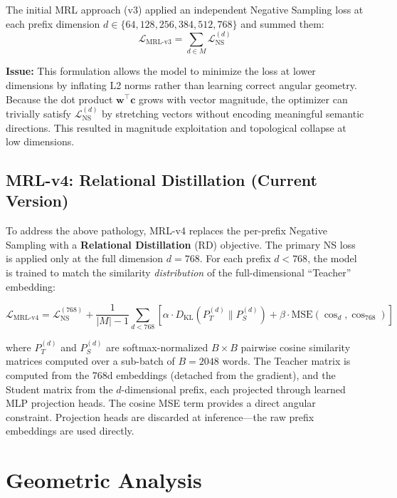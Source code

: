 \documentclass[11pt,a4paper]{article}
\begin{document}
The initial MRL approach (v3) applied an independent Negative Sampling loss at each prefix dimension $d \in \{64, 128, 256, 384, 512, 768\}$ and summed them:
\begin{equation}
\mathcal{L}_{\text{MRL-v3}} = \sum_{d \in M} \mathcal{L}_{\text{NS}}^{(d)}
\end{equation}

\textbf{Issue:} This formulation allows the model to minimize the loss at lower dimensions by inflating L2 norms rather than learning correct angular geometry. Because the dot product $\mathbf{w}^\top \mathbf{c}$ grows with vector magnitude, the optimizer can trivially satisfy $\mathcal{L}_{\text{NS}}^{(d)}$ by stretching vectors without encoding meaningful semantic directions. This resulted in magnitude exploitation and topological collapse at low dimensions.

\subsection{MRL-v4: Relational Distillation (Current Version)}

To address the above pathology, MRL-v4 replaces the per-prefix Negative Sampling with a \textbf{Relational Distillation} (RD) objective. The primary NS loss is applied only at the full dimension $d=768$. For each prefix $d < 768$, the model is trained to match the similarity \textit{distribution} of the full-dimensional ``Teacher'' embedding:

\begin{equation}
\mathcal{L}_{\text{MRL-v4}} = \mathcal{L}_{\text{NS}}^{(768)} + \frac{1}{|M|-1}\sum_{d < 768} \left[\alpha \cdot D_{\text{KL}}(P_T^{(d)} \| P_S^{(d)}) + \beta \cdot \text{MSE}(\cos_d, \cos_{768})\right]
\end{equation}

where $P_T^{(d)}$ and $P_S^{(d)}$ are softmax-normalized $B \times B$ pairwise cosine similarity matrices computed over a sub-batch of $B=2048$ words. The Teacher matrix is computed from the 768d embeddings (detached from the gradient), and the Student matrix from the $d$-dimensional prefix, each projected through learned MLP projection heads. The cosine MSE term provides a direct angular constraint. Projection heads are discarded at inference---the raw prefix embeddings are used directly.

\section{Geometric Analysis}
\end{document}

